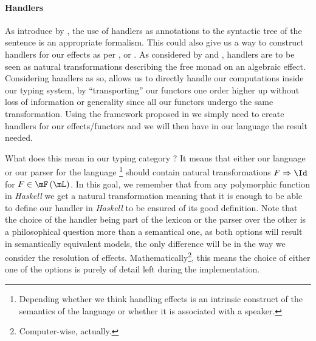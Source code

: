 \documentclass[math, english, info]{cours}
\begin{document}
\paragraph{Handlers}
\label{par:handlers}
As introduce by , the use of handlers as annotations to the syntactic tree of the sentence is an appropriate formalism.
This could also give us a way to construct handlers for our effects as per , or .
As considered by  and , handlers are to be seen as natural transformations describing the free monad on an algebraic effect.
Considering handlers as so, allows us to directly handle our computations inside our typing system, by ``transporting'' our functors one order higher up without loss of information or generality since all our functors undergo the same transformation.
Using the framework proposed in \cite{vandenbergFrameworkHigherorderEffects2024} we simply need to create handlers for our effects/functors and we will then have in our language the result needed.

\medskip

What does this mean in our typing category ?
It means that either our language or our parser for the language \footnote{Depending whether we think handling effects is an intrinsic construct of the semantics of the language or whether it is associated with a speaker.} should contain natural transformations $F \Rightarrow \Id$ for $F \in \mF\left( \mL \right)$.
In this goal, we remember that from any polymorphic function in \emph{Haskell} we get a natural transformation \cite{wadlerTheoremsFree1989} meaning that it is enough to be able to define our handler in \emph{Haskell} to be ensured of its good definition.
Note that the choice of the handler being part of the lexicon or the parser over the other is a philosophical question more than a semantical one, as both options will result in semantically equivalent models, the only difference will be in the way we consider the resolution of effects.
Mathematically\footnote{Computer-wise, actually.}, this means the choice of either one of the options is purely of detail left during the implementation.
\end{document}

